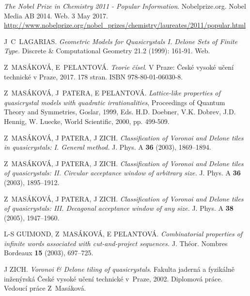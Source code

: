\documentclass[text.tex]{subfiles}
\begin{document}
\begin{thebibliography}{9}

\emph{The Nobel Prize in Chemistry 2011 - Popular Information}. Nobelprize.org. Nobel Media AB 2014. Web. 3 May 2017. \url{http://www.nobelprize.org/nobel_prizes/chemistry/laureates/2011/popular.html}

J~C~LAGARIAS. \emph{Geometric Models for Quasicrystals I. Delone Sets of Finite Type.} Discrete \& Computational Geometry 21.2 (1999): 161-91. Web.

Z~MASÁKOVÁ, E~PELANTOVÁ. \emph{Teorie čísel}. V Praze: České vysoké učení technické v Praze, 2017. 178 stran. ISBN 978-80-01-06030-8.

Z~MASÁKOVÁ, J~PATERA, E PELANTOVÁ. \emph{Lattice-like properties of quasicrystal models with quadratic irrationalities},  Proceedings of Quantum Theory and Symmetries, Goslar, 1999, Eds. H.D. Doebner, V.K. Dobrev, J.D. Hennig, W. Luecke, World Scientific, 2000, pp. 499-509.

	Z~MASÁKOVÁ, J PATERA, J ZICH. \emph{Classification of Voronoi and Delone tiles in quasicrystals: I. General method.} J. Phys. A \textbf{36} (2003), 1869--1894.

	Z~MASÁKOVÁ, J PATERA, J ZICH. \emph{Classification of Voronoi and Delone tiles of quasicrystals: II. Circular acceptance window of arbitrary size.} J. Phys. A \textbf{36} (2003), 1895--1912.

	Z~MASÁKOVÁ, J PATERA, J ZICH. \emph{Classification of Voronoi and Delone tiles of quasicrystals: III. Decagonal acceptance window of any size.} J. Phys. A \textbf{38} (2005), 1947--1960.

	L-S GUIMOND, Z~MASÁKOVÁ, E PELANTOVÁ. \emph{Combinatorial properties of infinite words associated with cut-and-project
 sequences.} J. Théor. Nombres Bordeaux \textbf{15} (2003), 697--725.
	
	J ZICH. \emph{Voronoi \& Delone tiling of quasicrystals}. Fakulta jaderná a fyzikálně inženýrská České vysoké učení technické v~Praze, 2002. Diplomová práce. Vedoucí práce Z~Masáková.
	
\end{thebibliography}
\end{document}
